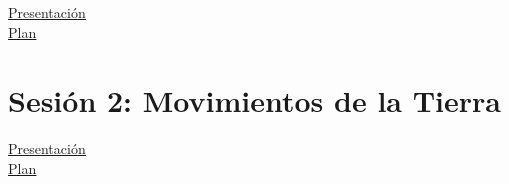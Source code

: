 \documentclass[10pt,a4paper]{article}
\begin{document}
\href{https://github.com/miguelta281/Universo_Medible_II/blob/master/Presentaciones/Sesiones/Sesion_1/sesion_1.pdf}{\underline{Presentación}} \\

\href{https://github.com/miguelta281/Universo_Medible_II/blob/master/Organizacion/Planes/Sesion_1/Plan_sesion_1.pdf}{\underline{Plan}} \\

\section{Sesión 2: Movimientos de la Tierra}

\href{https://github.com/miguelta281/Universo_Medible_II/blob/master/Presentaciones/Sesiones/Sesion_1/sesion_1.pdf}{\underline{Presentación}} \\

\href{https://github.com/miguelta281/Universo_Medible_II/blob/master/Organizacion/Planes/Sesion_1/Plan_sesion_1.pdf}{\underline{Plan}} \\
\end{document}
